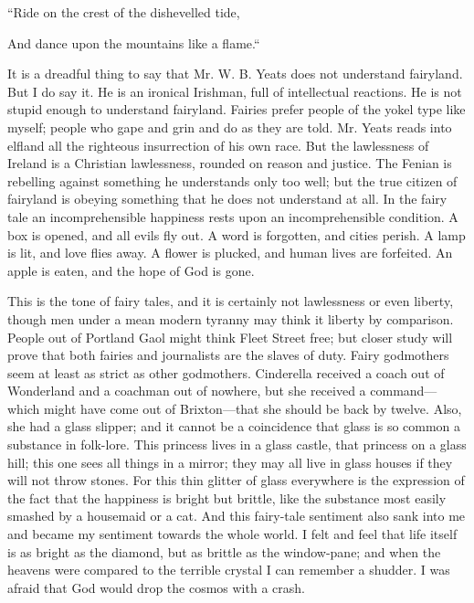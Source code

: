 “Ride on the crest of the dishevelled tide,

And dance upon the mountains like a flame.“

It is a dreadful thing to say that Mr. W. B. Yeats does not understand fairyland. But I do say it. He is an ironical Irishman, full of intellectual reactions. He is not stupid enough to understand fairyland. Fairies prefer people of the yokel type like myself; people who gape and grin and do as they are told. Mr. Yeats reads into elfland all the righteous insurrection of his own race. But the lawlessness of Ireland is a Christian lawlessness, rounded on reason and justice. The Fenian is rebelling against something he understands only too well; but the true citizen of fairyland is obeying something that he does not understand at all. In the fairy tale an incomprehensible happiness rests upon an incomprehensible condition. A box is opened, and all evils fly out. A word is forgotten, and cities perish. A lamp is lit, and love flies away. A flower is plucked, and human lives are forfeited. An apple is eaten, and the hope of God is gone.

This is the tone of fairy tales, and it is certainly not lawlessness or even liberty, though men under a mean modern tyranny may think it liberty by comparison. People out of Portland Gaol might think Fleet Street free; but closer study will prove that both fairies and journalists are the slaves of duty. Fairy godmothers seem at least as strict as other godmothers. Cinderella received a coach out of Wonderland and a coachman out of nowhere, but she received a command— which might have come out of Brixton—that she should be back by twelve. Also, she had a glass slipper; and it cannot be a coincidence that glass is so common a substance in folk-lore. This princess lives in a glass castle, that princess on a glass hill; this one sees all things in a mirror; they may all live in glass houses if they will not throw stones. For this thin glitter of glass everywhere is the expression of the fact that the happiness is bright but brittle, like the substance most easily smashed by a housemaid or a cat. And this fairy-tale sentiment also sank into me and became my sentiment towards the whole world. I felt and feel that life itself is as bright as the diamond, but as brittle as the window-pane; and when the heavens were compared to the terrible crystal I can remember a shudder. I was afraid that God would drop the cosmos with a crash.

